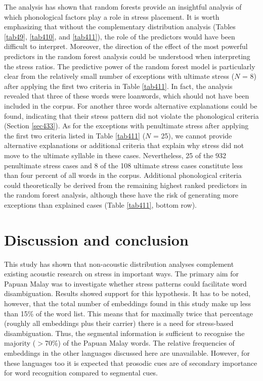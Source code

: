 The analysis has shown that random forests provide an insightful analysis of which phonological factors play a role in stress placement. It is worth emphasizing that without the complementary distribution analysis (Tables \ref{tab49}, \ref{tab410}, and \ref{tab411}), the role of the predictors would have been difficult to interpret. Moreover, the direction of the effect of the most powerful predictors in the random forest analysis could be understood when interpreting the stress ratios. The predictive power of the random forest model is particularly clear from the relatively small number of exceptions with ultimate stress ($N$ = 8) after applying the first two criteria in Table \ref{tab411}. In fact, the analysis revealed that three of these words were loanwords, which should not have been included in the corpus. For another three words alternative explanations could be found, indicating that their stress pattern did not violate the phonological criteria (Section \ref{sec433}). As for the exceptions with penultimate stress after applying the first two criteria listed in Table \ref{tab411} ($N$ = 25), we cannot provide alternative explanations or additional criteria that explain why stress did not move to the ultimate syllable in these cases. Nevertheless, 25 of the 932 penultimate stress cases and 8 of the 108 ultimate stress cases constitute less than four percent of all words in the corpus. Additional phonological criteria could theoretically be derived from the remaining highest ranked predictors in the random forest analysis, although these have the risk of generating more exceptions than explained cases (Table \ref{tab411}, bottom row).

\section{Discussion and conclusion} \label{sec44}
This study has shown that non-acoustic distribution analyses complement existing acoustic research on stress in important ways. The primary aim for Papuan Malay was to investigate whether stress patterns could facilitate word disambiguation. Results showed support for this hypothesis. It has to be noted, however, that the total number of embeddings found in this study make up less than 15\% of the word list. This means that for maximally twice that percentage (roughly all embeddings plus their carrier) there is a need for stress-based disambiguation. Thus, the segmental information is sufficient to recognise the majority ($>$70\%) of the Papuan Malay words. The relative frequencies of embeddings in the other languages discussed here are unavailable. However, for these languages too it is expected that prosodic cues are of secondary importance for word recognition compared to segmental cues.\par

